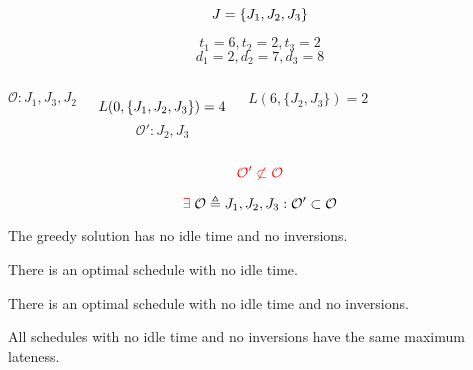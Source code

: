 \begin{frame}{}
  \[
    J = \left\{J_1, J_2, J_3\right\}
  \]

  \[
    t_1 = 6, t_2 = 2, t_3 = 2
  \]
  \[
    d_1 = 2, d_2 = 7, d_3 = 8
  \]

  \pause
  \vspace{0.30cm}
  \begin{columns}
      \[
	\mathcal{O}: J_1, J_3, J_2
      \]

      \[
	L(0, \left\{J_1, J_2, J_3\right\}) = 4
      \]
      \pause
      \[
	\mathcal{O'}: J_2, J_3
      \]

      \[
	L(6, \{J_2, J_3\}) = 2
      \]
  \end{columns}

  \pause
  \vspace{0.40cm}
  \[
    \textcolor{red}{\mathcal{O'} \not\subset \mathcal{O}}
  \]

  \pause
  \[
    \textcolor{red}{\exists}\; \mathcal{O} \triangleq J_1, J_2, J_3: \mathcal{O'} \subset \mathcal{O}
  \]
\end{frame}

\begin{frame}{}
  \begin{theorem}
    The greedy solution has no idle time and no inversions.
  \end{theorem}

  \pause
  \vspace{0.30cm}
  \begin{theorem}
    There is an optimal schedule with no idle time.
  \end{theorem}

  \pause
  \begin{theorem}
    There is an optimal schedule with no idle time and no inversions.
  \end{theorem}
  \pause
  \centerline{\it {}}

  \pause
  \vspace{0.10cm}
  \begin{theorem}
    All schedules with no idle time and no inversions have the same maximum lateness.
  \end{theorem}
\end{frame}

